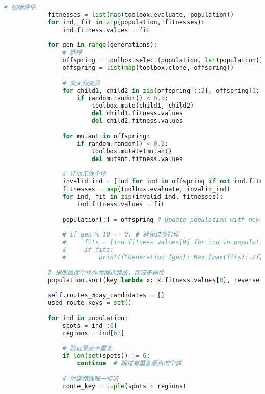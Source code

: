 \begin{lstlisting}[language=Python]
            # 初始评估
            fitnesses = list(map(toolbox.evaluate, population))
            for ind, fit in zip(population, fitnesses):
                ind.fitness.values = fit
            
            for gen in range(generations):
                # 选择
                offspring = toolbox.select(population, len(population))
                offspring = list(map(toolbox.clone, offspring))
                
                # 交叉和变异
                for child1, child2 in zip(offspring[::2], offspring[1::2]):
                    if random.random() < 0.5:
                        toolbox.mate(child1, child2)
                        del child1.fitness.values
                        del child2.fitness.values
                
                for mutant in offspring:
                    if random.random() < 0.2:
                        toolbox.mutate(mutant)
                        del mutant.fitness.values
                
                # 评估无效个体
                invalid_ind = [ind for ind in offspring if not ind.fitness.valid]
                fitnesses = map(toolbox.evaluate, invalid_ind)
                for ind, fit in zip(invalid_ind, fitnesses):
                    ind.fitness.values = fit
                
                population[:] = offspring # Update population with new generation
                
                # if gen % 10 == 0: # 避免过多打印
                #     fits = [ind.fitness.values[0] for ind in population if ind.fitness.valid]
                #     if fits:
                #         print(f"Generation {gen}: Max={max(fits):.2f}, Avg={np.mean(fits):.2f}")
            
            # 提取最优个体作为候选路线，保证多样性
            population.sort(key=lambda x: x.fitness.values[0], reverse=True)
            
            self.routes_3day_candidates = []
            used_route_keys = set()
            
            for ind in population:
                spots = ind[:6]
                regions = ind[6:]
                
                # 验证景点不重复
                if len(set(spots)) != 6:
                    continue  # 跳过有重复景点的个体
                
                # 创建路线唯一标识
                route_key = tuple(spots + regions)
                

\end{lstlisting}
